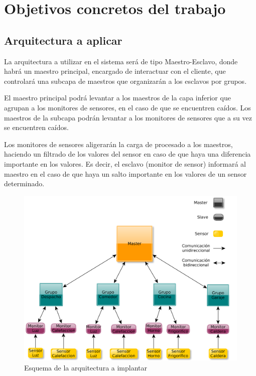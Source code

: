 \documentclass[a4paper,10pt]{article}
\begin{document}
\newpage

\section{Objetivos concretos del trabajo}

\subsection{Arquitectura a aplicar}
La arquitectura a utilizar en el sistema será de tipo Maestro-Esclavo, donde 
habrá un maestro principal, encargado de interactuar con el cliente, que 
controlará una subcapa de maestros que organizarán a los esclavos por grupos.

El maestro principal podrá levantar a los maestros de la capa inferior que 
agrupan a los monitores de sensores, en el caso de que se encuentren caídos. Los 
maestros de la subcapa podrán levantar a los monitores de sensores que a su vez 
se encuentren caídos.

Los monitores de sensores aligerarán la carga de procesado a los maestros, 
haciendo un filtrado de los valores del sensor en caso de que haya una 
diferencia importante en los valores. Es decir, el esclavo (monitor de sensor) 
informará al maestro en el caso de que haya un salto importante en los valores 
de un sensor determinado.

\begin{figure}[h!]
  \centering
  \includegraphics[width=\textwidth]{images/arch.png}
  \caption{Esquema de la arquitectura a implantar}
  \label{fig:arch}
\end{figure}
\end{document}
